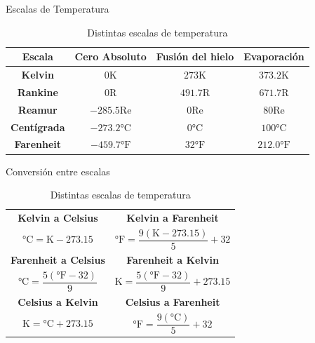\documentclass[aspectratio=169]{beamer}
\begin{document}
\begin{frame}{Escalas de Temperatura}
\begin{table}[c]
    \centering
    \begin{tabular}{cccc}
        \toprule
        \textbf{Escala} & \textbf{Cero Absoluto} &\textbf{Fusión del hielo} & \textbf{Evaporación} \\
        \midrule
        \textbf{Kelvin} & $0\si{\kelvin}$ & $273\si{\kelvin}$ & $373.2\si{\kelvin}$ \\
        \textbf{Rankine} & $0\mathrm{R}$ & $491.7\mathrm{R}$ & $671.7\mathrm{R}$ \\
        \textbf{Reamur} & $-285.5\mathrm{Re}$ & $0\mathrm{Re}$ & $80\mathrm{Re}$ \\
        \textbf{Centígrada} & $-273.2\si{\celsius}$ & $0\si{\celsius}$ & $100\si{\celsius}$ \\
        \textbf{Farenheit} & $-459.7\si{\degree}\mathrm{F}$ & $32\si{\degree}\mathrm{F}$ & $212.0\si{\degree}\mathrm{F}$ \\
        \bottomrule
    \end{tabular}
    \caption{Distintas escalas de temperatura \cite{cengel2003termodinamica}} 
    \label{tab:limites}
\end{table}
\end{frame}

\begin{frame}{Conversión entre escalas}
\setlength{\extrarowheight}{4pt}
\begin{table}[c]
    \centering
    \begin{tabular}{|c|c|}
        \hline
        \textbf{Kelvin a Celsius} & \textbf{Kelvin a Farenheit}\\
        \Large{$\si{\celsius}=\si{\kelvin}-273.15$} & \Large{$\si{\degree}\mathrm{F}=\dfrac{9(\si{\kelvin}-273.15)}{5}+32$}\\[10pt]
        \hline
        \textbf{Farenheit a Celsius} & \textbf{Farenheit a Kelvin} \\
        \Large{$\si{\celsius}=\dfrac{5(\si{\degree}\mathrm{F}-32)}{9}$ } & \Large{$\si{\kelvin}=\dfrac{5(\si{\degree}\mathrm{F}-32)}{9}+273.15$}\\[10pt]
        \hline
        \textbf{Celsius a Kelvin} & \textbf{Celsius a Farenheit} \\
        \Large{$\si{\kelvin}=\si{\celsius}+273.15$ } & \Large{$\si{\degree}\mathrm{F}=\dfrac{9(\si{\celsius})}{5}+32$}\\[10pt]
        \hline
    \end{tabular}
    \caption{Distintas escalas de temperatura \cite{cengel2003termodinamica}}
    \label{tab:conversion}
\end{table}
\end{frame}
\end{document}
